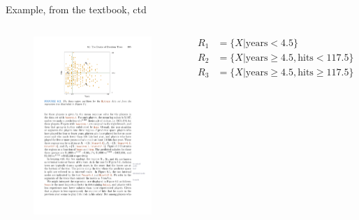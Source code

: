\documentclass[mathserif, aspectratio=169]{beamer}
\begin{document}
\begin{frame}{Example, from the textbook, ctd}

\begin{columns}
\begin{figure}
\includegraphics[height=0.5\textheight]{simple_partitioned_space}
\caption*{}
\end{figure}

\begin{align*}
R_1 &= \{X|\text{years}<4.5\}\\
R_2 &= \{X|\text{years}\ge 4.5, \text{hits}<117.5 \}\\
R_3 &= \{X|\text{years}\ge 4.5, \text{hits}\ge 117.5\}
\end{align*}
\end{columns}

\end{frame}
\end{document}
